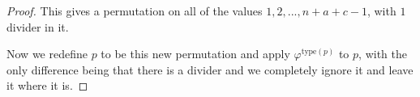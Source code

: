 \documentclass[11pt]{amsart}
\theoremstyle{remark}
\numberwithin{equation}{section}
\begin{document}
\begin{proof}
This gives a permutation on all of the values $1, 2, ..., n+a+c-1$, with $1$ divider in it.


Now we redefine $p$ to be this new permutation and apply $\varphi^{\text{type}(p)}$ to $p$, with the only difference being that there is a divider and we completely ignore it and leave it where it is. 



        

\end{proof}
\end{document}
